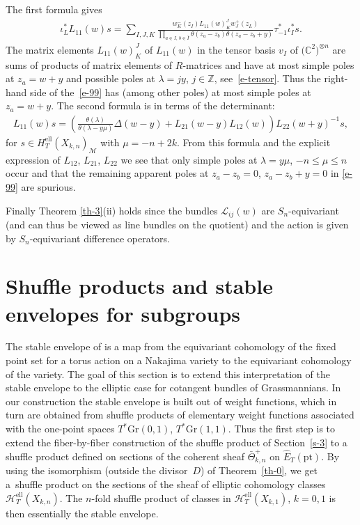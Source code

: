 \documentclass[10pt,a4paper]{amsart}
\numberwithin{equation}{section}
\begin{document}
The first formula gives
\begin{gather}\label{e-99}
 \iota_L^*L_{11}(w)s=\sum_{I,J,K} \frac{w^-_K(z_I)L_{11}(w)_K^Jw^+_J(z_L)} {\prod\limits_{a\in I,\,b\in\bar I}\theta(z_a-z_b) \theta(z_a-z_b+y)} \tau_{-1}^*\iota_I^*s.
\end{gather}
The matrix elements $L_{11}(w)_K^J$ of $L_{11}(w)$ in the tensor basis $v_I$ of $\big(\mathbb C^2\big)^{\otimes n}$ are sums of products of matrix elements of $R$-matrices and have at most simple poles at $z_a=w+y$ and possible poles at $\lambda=jy$, $j\in\mathbb Z$, see~\eqref{e-tensor}. Thus the right-hand side of the~\eqref{e-99} has (among other poles) at most simple poles at $z_a=w+y$. The second formula is in terms of the determinant:
\begin{gather*}
 L_{11}(w)s=\left(\frac{\theta(\lambda)} {\theta(\lambda-y\mu)}\Delta(w-y) +L_{21}(w-y)L_{12}(w)\right)L_{22}(w+y)^{-1}s,
\end{gather*}
for $s\in H_T^{\mathrm{ell}}(X_{k,n})_{\mathcal M}$ with $\mu=-n+2k$. From this formula and the explicit expression of $L_{12}$, $L_{21}$, $L_{22}$ we see that only simple poles at $\lambda=y\mu$, $-n\leq \mu\leq n$ occur and that the remaining apparent poles at $z_a-z_b=0$, $z_a-z_b+y=0$ in \eqref{e-99} are spurious.

Finally Theorem \ref{th-3}(ii) holds since the bundles $\mathcal L_{ij}(w)$ are $S_n$-equivariant (and can thus be viewed as line bundles on the quotient) and the action is given by $S_n$-equivariant difference operators.

\section{Shuffle products and stable envelopes for subgroups}\label{s-7}
The stable envelope of \cite{MO} is a map from the equivariant cohomology of the fixed point set for a torus action on a Nakajima variety to the equivariant cohomology of the variety. The goal of this section is to extend this interpretation of the stable envelope to the elliptic case for cotangent bundles of Grassmannians. In our construction the stable envelope is built out of weight functions, which in turn are obtained from shuffle products of elementary weight functions associated with the one-point spaces $T^*\mathrm{Gr}(0,1)$, $T^*\mathrm{Gr}(1,1)$. Thus the first step is to extend the fiber-by-fiber construction of the shuffle product of Section~\ref{s-3} to a shuffle product defined on sections of the coherent sheaf $\bar\Theta^+_{k,n}$ on $\hat E_T(\mathrm{pt})$. By using the isomorphism (outside the divisor~$D$) of Theorem~\ref{th-0}, we get a~shuffle product on the sections of the sheaf of elliptic cohomology classes $\mathcal H^{\mathrm{ell}}_{T}(X_{k,n})$. The $n$-fold shuffle product of classes in $\mathcal H^{\mathrm{ell}}_{T}(X_{k,1})$, $k=0,1$ is then essentially the stable envelope.
\end{document}
